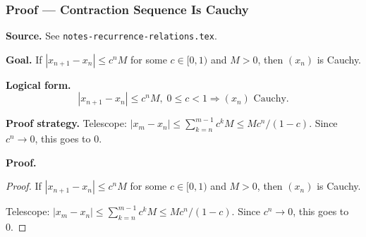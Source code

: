 
\clearpage
{}
\hypertarget{proof-RA-ABB-P-contraction-cauchy}{}

\subsubsection[Contraction Sequence Is Cauchy]{Proof --- Contraction Sequence Is Cauchy}

\bigskip

\noindent
\textbf{Source.} See \texttt{notes-recurrence-relations.tex}.

\vspace{0.75em}

\noindent
\textbf{Goal.} If $|x_{n+1} - x_n| \le c^n M$ for some $c \in [0,1)$ and $M > 0$, then $(x_n)$ is Cauchy.

\vspace{0.75em}

\noindent
\textbf{Logical form.}
\[
  |x_{n+1} - x_n| \le c^n M,\; 0 \le c < 1 \Rightarrow (x_n) \text{ Cauchy}.
\]

\vspace{0.75em}

\noindent
\textbf{Proof strategy.} Telescope: $|x_m - x_n| \le \sum_{k=n}^{m-1} c^k M \le Mc^n/(1-c)$. Since $c^n \to 0$, this goes to 0.

\vspace{0.75em}

\noindent
\textbf{Proof.}
\begin{proof}
\Claim If $|x_{n+1} - x_n| \le c^n M$ for some $c \in [0,1)$ and $M > 0$, then $(x_n)$ is Cauchy.

\Given 

\Goal 

\Strategy Telescope: $|x_m - x_n| \le \sum_{k=n}^{m-1} c^k M \le Mc^n/(1-c)$. Since $c^n \to 0$, this goes to 0.

\medskip


\end{proof}

